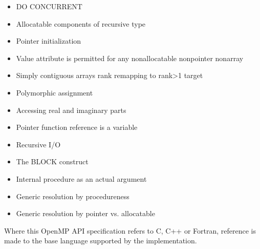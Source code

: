 \begin{itemize}
\begin{itemize}
\item DO CONCURRENT
\item Allocatable components of recursive type
\item Pointer initialization
\item Value attribute is permitted for any nonallocatable nonpointer nonarray
\item Simply contiguous arrays rank remapping to rank>1 target
\item Polymorphic assignment
\item Accessing real and imaginary parts
\item Pointer function reference is a variable
\item Recursive I/O
\item The BLOCK construct
\item Internal procedure as an actual argument
\item Generic resolution by procedureness
\item Generic resolution by pointer vs. allocatable
\end{itemize}

\end{itemize}

Where this OpenMP API specification refers to C, C++ or Fortran, reference is made to
the base language supported by the implementation.

